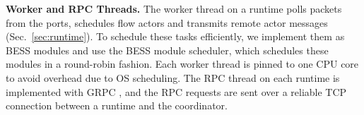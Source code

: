\vspace{1mm}
\noindent \textbf{Worker and RPC Threads.}
The worker thread on a runtime polls packets from the ports, schedules flow actors and transmits remote actor messages (Sec.~\ref{sec:runtime}). To schedule these tasks efficiently, we implement them as BESS modules and use the BESS module scheduler, which schedules these modules in a round-robin fashion. Each worker thread is pinned to one CPU core to avoid overhead due to OS scheduling. %
 The RPC thread on each runtime is implemented with GRPC \cite{grpc}, and the RPC requests are sent over a reliable TCP connection between a runtime and the coordinator.
 





